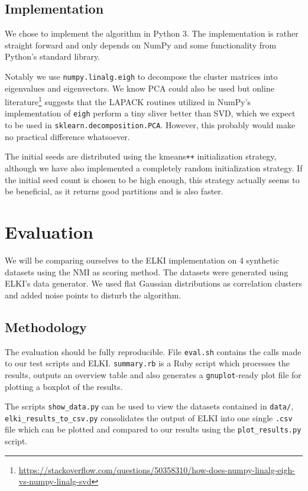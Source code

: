 \documentclass[english]{scrartcl}
\begin{document}
\subsection{Implementation}

We chose to implement the algorithm in Python 3. The implementation is rather straight
forward and only depends on NumPy and some functionality from Python's standard
library.

Notably we use \texttt{numpy.linalg.eigh} to decompose the cluster matrices
into eigenvalues and eigenvectors. We know PCA could also be used but online
literature\footnote{\url{https://stackoverflow.com/questions/50358310/how-does-numpy-linalg-eigh-vs-numpy-linalg-svd}}
suggests that the LAPACK routines utilized in NumPy's implementation of
\texttt{eigh} perform a tiny sliver better than SVD, which we expect to be used
in \texttt{sklearn.decomposition.PCA}.  However, this probably would make no
practical difference whatsoever.

The initial seeds are distributed using the kmeans\texttt{++} initialization strategy,
although we have also implemented a completely random initialization strategy.
If the initial seed count is chosen to be high enough, this strategy actually
seems to be beneficial, as it returns good partitions and is also faster.


\pagebreak
\section{Evaluation}

We will be comparing ourselves to the ELKI implementation on 4 synthetic datasets
using the NMI as scoring method. The datasets were generated using ELKI's data generator.
We used flat Gaussian distributions as correlation clusters and added noise points
to disturb the algorithm.

\subsection{Methodology}

The evaluation should be fully reproducible. File \texttt{eval.sh} contains the calls made to our
test scripts and ELKI. \texttt{summary.rb} is a Ruby script which processes the results, outputs
an overview table and also generates a \texttt{gnuplot}-ready plot file for plotting a boxplot of
the results.

The scripts \texttt{show\_data.py} can be used to view the datasets contained in \texttt{data/},
\texttt{elki\_results\_to\_csv.py} consolidates the output of ELKI into one single \texttt{.csv}
file which can be plotted and compared to our results using the \texttt{plot\_results.py} script.
\end{document}
